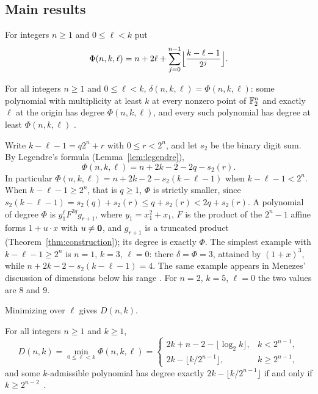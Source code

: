 \subsection{Main results}

For integers \(n\ge1\) and \(0\le\ell<k\) put
\[
 \Phi(n,k,\ell)=n+2\ell+\sum_{j=0}^{n-1}\Bigl\lfloor\frac{k-\ell-1}{2^j}\Bigr\rfloor .
\]

\begin{theorem}\label{thm:main}
For all integers \(n\ge1\) and \(0\le\ell<k\),
\(\delta(n,k,\ell)=\Phi(n,k,\ell)\): some polynomial with multiplicity at least
\(k\) at every nonzero point of \(\mathbb F_2^n\) and exactly \(\ell\) at the origin has
degree \(\Phi(n,k,\ell)\), and every such polynomial has degree at least
\(\Phi(n,k,\ell)\) .
\end{theorem}

Write \(k-\ell-1=q2^n+r\) with \(0\le r<2^n\), and let \(s_2\) be the binary
digit sum. By Legendre's formula (Lemma~\ref{lem:legendre}),
\[
 \Phi(n,k,\ell)=n+2k-2-2q-s_2(r).
\]
In particular \(\Phi(n,k,\ell)=n+2k-2-s_2(k-\ell-1)\) when \(k-\ell-1<2^n\). When
\(k-\ell-1\ge2^n\), that is \(q\ge1\), \(\Phi\) is strictly smaller, since
\(s_2(k-\ell-1)=s_2(q)+s_2(r)\le q+s_2(r)<2q+s_2(r)\).
A polynomial of degree \(\Phi\) is \(y_1^\ell F^{2q}g_{r+1}\), where
\(y_1=x_1^2+x_1\), \(F\) is the product of the \(2^n-1\) affine forms
\(1+u\cdot x\) with \(u\ne\mathbf 0\), and \(g_{r+1}\) is a truncated product
(Theorem~\ref{thm:construction}); its degree is exactly \(\Phi\). The simplest
example with \(k-\ell-1\ge2^n\) is \(n=1\), \(k=3\), \(\ell=0\): there
\(\delta=\Phi=3\), attained by \((1+x)^3\), while \(n+2k-2-s_2(k-\ell-1)=4\). The same
example appears in Menezes' discussion of dimensions below his range
\cite[Section~8]{Men26}. For \(n=2\), \(k=5\), \(\ell=0\) the two values are \(8\)
and \(9\).

Minimizing over \(\ell\) gives \(D(n,k)\).

\begin{corollary}\label{cor:main}
For all integers \(n\ge1\) and \(k\ge1\),
\[
 D(n,k)=\min_{0\le\ell<k}\Phi(n,k,\ell)=\begin{cases}
 2k+n-2-\lfloor\log_2k\rfloor, & k<2^{n-1},\\
 2k-\lfloor k/2^{n-1}\rfloor, & k\ge2^{n-1},
 \end{cases}
\]
and some \(k\)-admissible polynomial has degree exactly
\(2k-\lfloor k/2^{n-1}\rfloor\) if and only if \(k\ge2^{n-2}\)
\textnormal{\small{}\,}.
\end{corollary}

